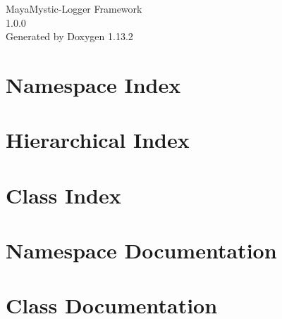 \documentclass[twoside]{book}
\newcommand{\+}{\discretionary{\mbox{\scriptsize$\hookleftarrow$}}{}{}}
\newcommand{\clearemptydoublepage}{%
    \newpage{\pagestyle{empty}\cleardoublepage}%
  }
\begin{document}
  \raggedbottom
    \hypersetup{pageanchor=false,
                bookmarksnumbered=true,
                pdfencoding=unicode
               }
  \begin{titlepage}
  \vspace*{7cm}
  \begin{center}%
  {\Large Maya\+Mystic-\/\+Logger Framework}\\
  [1ex]\large 1.\+0.\+0 \\
  \vspace*{1cm}
  {\large Generated by Doxygen 1.13.2}\\
  \end{center}
  \end{titlepage}
  \clearemptydoublepage
  \tableofcontents
  \clearemptydoublepage
  \hypersetup{pageanchor=true}
\chapter{Namespace Index}

\chapter{Hierarchical Index}

\chapter{Class Index}

\chapter{Namespace Documentation}








\chapter{Class Documentation}




  \backmatter
  \newpage
  \clearemptydoublepage
  \printindex
\end{document}
